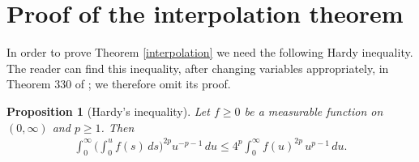 \documentclass[oneside]{amsart}
\newtheorem{proposition}[theorem]{Proposition}
\theoremstyle{definition}
\theoremstyle{plain}
\numberwithin{equation}{section}
\numberwithin{theorem}{section}
\begin{document}
\appendix

\section{Proof of the interpolation theorem} \label{app:interpolation}

In order to prove Theorem \ref{interpolation} we need the following Hardy
inequality. The reader can find this inequality, after changing variables
appropriately, in Theorem 330 of \cite{HLP1988}; we therefore omit its
proof.
\begin{proposition}[Hardy's inequality]
  Let $f \geq 0$ be a measurable function on $(0,\infty)$ and $p \geq 1$. Then
  \begin{align} \label{hardy:ineq}
    \int_0^\infty \bigg(
      \int_0^u f(s) \, ds
    \bigg)^{2p}u^{-p-1}\,du
    \leq4^p\int_0^\infty f(u)^{2p}\,u^{p-1}\,du.
  \end{align}
\end{proposition}
\end{document}
